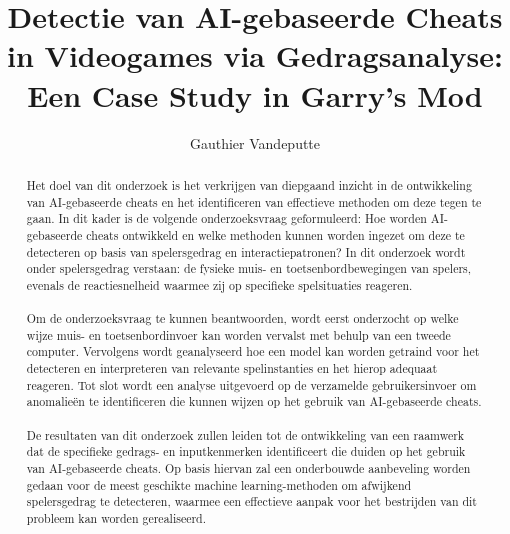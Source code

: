 \documentclass{hogent-article}
\title{Detectie van AI-gebaseerde Cheats in Videogames via Gedragsanalyse: Een Case Study in Garry’s Mod}
\author{Gauthier Vandeputte}
\begin{document}
\begin{abstract}
Het doel van dit onderzoek is het verkrijgen van diepgaand inzicht in de ontwikkeling van AI-gebaseerde cheats en het identificeren van effectieve methoden om deze tegen te gaan. In dit kader is de volgende onderzoeksvraag geformuleerd: Hoe worden AI-gebaseerde cheats ontwikkeld en welke methoden kunnen worden ingezet om deze te detecteren op basis van spelersgedrag en interactiepatronen? In dit onderzoek wordt onder spelersgedrag verstaan: de fysieke muis- en toetsenbordbewegingen van spelers, evenals de reactiesnelheid waarmee zij op specifieke spelsituaties reageren.
\\\\
Om de onderzoeksvraag te kunnen beantwoorden, wordt eerst onderzocht op welke wijze muis- en toetsenbordinvoer kan worden vervalst met behulp van een tweede computer. Vervolgens wordt geanalyseerd hoe een model kan worden getraind voor het detecteren en interpreteren van relevante spelinstanties en het hierop adequaat reageren. Tot slot wordt een analyse uitgevoerd op de verzamelde gebruikersinvoer om anomalieën te identificeren die kunnen wijzen op het gebruik van AI-gebaseerde cheats.
\\\\
De resultaten van dit onderzoek zullen leiden tot de ontwikkeling van een raamwerk dat de specifieke gedrags- en inputkenmerken identificeert die duiden op het gebruik van AI-gebaseerde cheats. Op basis hiervan zal een onderbouwde aanbeveling worden gedaan voor de meest geschikte machine learning-methoden om afwijkend spelersgedrag te detecteren, waarmee een effectieve aanpak voor het bestrijden van dit probleem kan worden gerealiseerd.
\end{abstract}

\tableofcontents



\printbibliography[heading=bibintoc]
\end{document}
